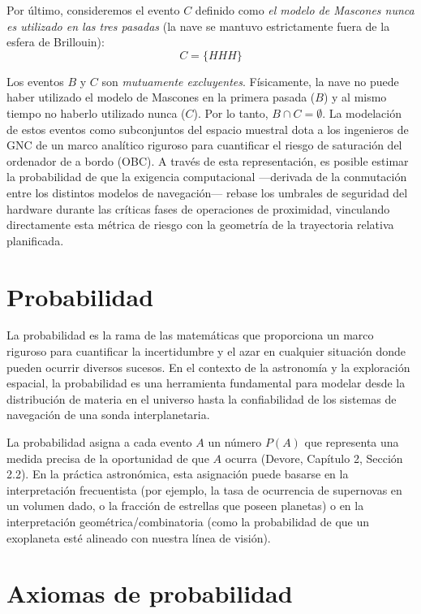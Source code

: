 Por último, consideremos el evento $C$ definido como \textit{el modelo de Mascones nunca es utilizado en las tres pasadas} (la nave se mantuvo estrictamente fuera de la esfera de Brillouin):
$$ C = \{HHH\} $$

Los eventos $B$ y $C$ son \textit{mutuamente excluyentes}. Físicamente, la nave no puede haber utilizado el modelo de Mascones en la primera pasada ($B$) y al mismo tiempo no haberlo utilizado nunca ($C$). Por lo tanto, $B \cap C = \emptyset$. La modelación de estos eventos como subconjuntos del espacio muestral dota a los ingenieros de GNC de un marco analítico riguroso para cuantificar el riesgo de saturación del ordenador de a bordo (OBC). A través de esta representación, es posible estimar la probabilidad de que la exigencia computacional —derivada de la conmutación entre los distintos modelos de navegación— rebase los umbrales de seguridad del hardware durante las críticas fases de operaciones de proximidad, vinculando directamente esta métrica de riesgo con la geometría de la trayectoria relativa planificada.

\section{Probabilidad}

La probabilidad es la rama de las matemáticas que proporciona un marco riguroso para cuantificar la incertidumbre y el azar en cualquier situación donde pueden ocurrir diversos sucesos. En el contexto de la astronomía y la exploración espacial, la probabilidad es una herramienta fundamental para modelar desde la distribución de materia en el universo hasta la confiabilidad de los sistemas de navegación de una sonda interplanetaria. 

La probabilidad asigna a cada evento $A$ un número $P(A)$ que representa una medida precisa de la oportunidad de que $A$ ocurra (Devore, Capítulo 2, Sección 2.2). En la práctica astronómica, esta asignación puede basarse en la interpretación frecuentista (por ejemplo, la tasa de ocurrencia de supernovas en un volumen dado, o la fracción de estrellas que poseen planetas) o en la interpretación geométrica/combinatoria (como la probabilidad de que un exoplaneta esté alineado con nuestra línea de visión). 

\section{Axiomas de probabilidad}

